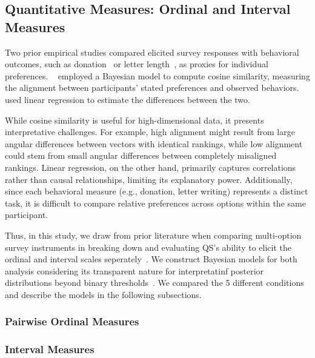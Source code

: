 \subsection{Quantitative Measures: Ordinal and Interval Measures}
\label{sec:quantitative_measures}
Two prior empirical studies compared elicited survey responses with behavioral outcomes, such as donation~\cite{chengCanShowWhat2021,cavaille2024cares} or letter length~\cite{cavaille2024cares}, as proxies for individual preferences. ~\citet{chengCanShowWhat2021} employed a Bayesian model to compute cosine similarity, measuring the alignment between participants' stated preferences and observed behaviors. ~\citet{cavaille2024cares} used linear regression to estimate the differences between the two.

While cosine similarity is useful for high-dimensional data, it presents interpretative challenges. For example, high alignment might result from large angular differences between vectors with identical rankings, while low alignment could stem from small angular differences between completely misaligned rankings. Linear regression, on the other hand, primarily captures correlations rather than causal relationships, limiting its explanatory power. Additionally, since each behavioral measure (e.g., donation, letter writing) represents a distinct task, it is difficult to compare relative preferences across options within the same participant.

Thus, in this study, we draw from prior literature when comparing multi-option survey instruments in breaking down and evaluating QS's ability to elicit the ordinal and interval scales seperately~\cite{collewetPreferenceEstimationPoint2023}. We construct Bayesian models for both analysis considering its transparent nature for interpretatinf posterior distributions beyond binary thresholds~\cite{mcelreath2018statistical, kay2016researcher}. We compared the 5 different conditions and describe the models in the following subsections.



\subsubsection{Pairwise Ordinal Measures}
\label{sec:ordinal_measures}


\subsubsection{Interval Measures}
\label{sec:interval_measures}

